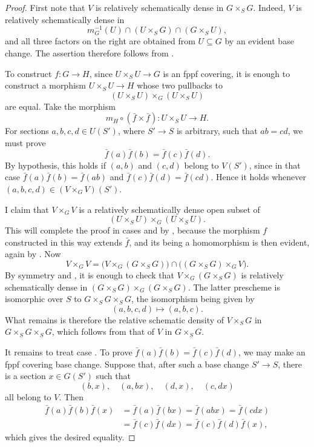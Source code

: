 \begin{proof}
First note that \(V\) is relatively schematically dense in
\(G\times_S G\). Indeed, \(V\) is relatively schematically dense in
\[
  m_G^{-1}(U)\cap(U\times_S G)\cap(G\times_S U),
\]
and all three factors on the right are obtained from \(U\subseteq G\) by
an evident base change. The assertion therefore
follows from .

To construct \(f:G\to H\), since \(U\times_S U\to G\) is an fppf
covering, it is enough to construct a morphism \(U\times_S U\to H\)
whose two pullbacks to
\[
  (U\times_S U)\times_G(U\times_S U)
\]
are equal. Take the morphism
\[
  m_H\circ(\bar f\times\bar f):U\times_S U\longrightarrow H.
\]
For sections \(a,b,c,d\in U(S')\), where \(S'\to S\) is arbitrary,
such that \(ab=cd\), we must prove
\[
  \bar f(a)\bar f(b)=\bar f(c)\bar f(d).
\]
By hypothesis, this holds if \((a,b)\) and \((c,d)\) belong to \(V(S')\), since in that case
\(\bar f(a)\bar f(b)=\bar f(ab)\) and \(\bar f(c)\bar f(d)=\bar f(cd)\). Hence it holds whenever
\((a,b,c,d)\in(V\times_G V)(S')\).

I claim that \(V\times_G V\) is a relatively schematically dense
open subset of
\[
  (U\times_S U)\times_G(U\times_S U).
\]
This will complete the proof in cases \textup{} and \textup{}
by , because the morphism \(f\) constructed in this way extends
\(\bar f\), and its being a homomorphism is then evident, again by
. Now
\[
  V\times_G V
  =
  \bigl(V\times_G(G\times_S G)\bigr)
  \cap
  \bigl((G\times_S G)\times_G V\bigr).
\]
By symmetry and , it is enough to check that
\(V\times_G(G\times_S G)\) is relatively schematically dense in
\((G\times_S G)\times_G(G\times_S G)\). The latter prescheme is
isomorphic over \(S\) to \(G\times_S G\times_S G\), the isomorphism
being given by
\[
  (a,b,c,d)\longmapsto(a,b,c).
\]
What remains is therefore the relative schematic density of
\(V\times_S G\) in \(G\times_S G\times_S G\), which follows from
that of \(V\) in \(G\times_S G\).

It remains to treat case \textup{}. To prove
\(\bar f(a)\bar f(b)=\bar f(c)\bar f(d)\), we may make an fppf
covering base change. Suppose that, after such a base change
\(S'\to S\), there is a section \(x\in G(S')\) such that
\[
  (b,x),\quad(a,bx),\quad(d,x),\quad(c,dx)
\]
all belong to \(V\). Then
\[
\begin{aligned}
  \bar f(a)\bar f(b)\bar f(x)
    &=\bar f(a)\bar f(bx)
     =\bar f(abx)
     =\bar f(cdx)\\
    &=\bar f(c)\bar f(dx)
     =\bar f(c)\bar f(d)\bar f(x),
\end{aligned}
\]
which gives the desired equality.


\end{proof}
